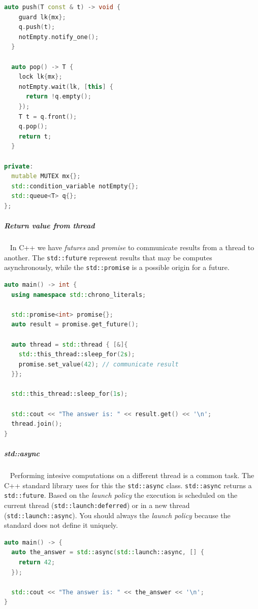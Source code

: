 \documentclass[11pt,twoside,landscape]{article}
\begin{document}
\begin{multicols}{2}
\begin{lstlisting}[language=c++,label=lst:example-usage-std-condition_variable,caption={Example usage std::condition\textsubscript{variable}},captionpos=b,numbers=none]
  auto push(T const & t) -> void {
    guard lk{mx};
    q.push(t);
    notEmpty.notify_one();
  }

  auto pop() -> T {
    lock lk{mx};
    notEmpty.wait(lk, [this] {
      return !q.empty();
    });
    T t = q.front();
    q.pop();
    return t;
  }

private:
  mutable MUTEX mx{};
  std::condition_variable notEmpty{};
  std::queue<T> q{};
};
\end{lstlisting}
\subparagraph{Return value from thread} \
\label{sec:orgb73f7a7}
In C++ we have \emph{futures} and \emph{promise} to communicate results from a thread to another.
The \texttt{std::future} represent results that may be computes asynchronously, while the \texttt{std::promise} is a possible origin for a future.

\begin{lstlisting}[language=c++,label=lst:example-usage-for-future-and-promise,caption={Example usage for future and promise},captionpos=b,numbers=none]
auto main() -> int {
  using namespace std::chrono_literals;

  std::promise<int> promise{};
  auto result = promise.get_future();

  auto thread = std::thread { [&]{
    std::this_thread::sleep_for(2s);
    promise.set_value(42); // communicate result
  }};

  std::this_thread::sleep_for(1s);

  std::cout << "The answer is: " << result.get() << '\n';
  thread.join();
}
\end{lstlisting}

\subparagraph{std::async} \
\label{sec:org84e8403}
Performing intesive computations on a different thread is a common task.
The C++ standard library uses for this the \texttt{std::async} class.
\texttt{std::async} returns a \texttt{std::future}.
Based on the \emph{launch policy} the execution is scheduled on the current thread (\texttt{std::launch:deferred}) or in a new thread (\texttt{std::launch::async}).
You should always the \emph{launch policy} because the standard does not define it uniquely. 

\begin{lstlisting}[language=c++,label=lst:example-usage-for-std-async,caption={Example usage for std::async},captionpos=b,numbers=none]
auto main() -> {
  auto the_answer = std::async(std::launch::async, [] {
    return 42;
  });

  std::cout << "The answer is: " << the_answer << '\n';
}
\end{lstlisting}


\end{multicols}
\end{document}
